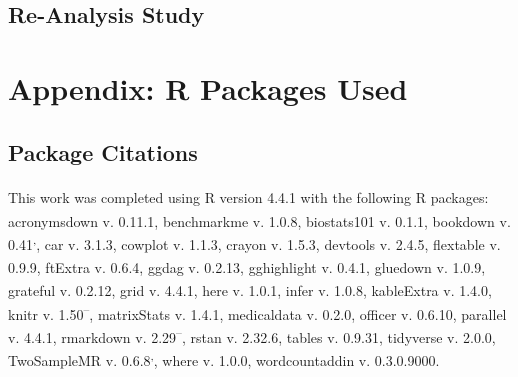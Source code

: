 \documentclass[
]{article}
\begin{document}
\newpage

\subsection{Re-Analysis Study}\label{appendix-sens-reanalysis}

\section{Appendix: R Packages Used}\label{appendix-pkg}

\subsection{Package Citations}\label{package-citations}

This work was completed using R version 4.4.1\textsuperscript{} with the following R packages: acronymsdown v. 0.11.1\textsuperscript{}, benchmarkme v. 1.0.8\textsuperscript{}, biostats101 v. 0.1.1\textsuperscript{}, bookdown v. 0.41\textsuperscript{,}, car v. 3.1.3\textsuperscript{}, cowplot v. 1.1.3\textsuperscript{}, crayon v. 1.5.3\textsuperscript{}, devtools v. 2.4.5\textsuperscript{}, flextable v. 0.9.9\textsuperscript{}, ftExtra v. 0.6.4\textsuperscript{}, ggdag v. 0.2.13\textsuperscript{}, gghighlight v. 0.4.1\textsuperscript{}, gluedown v. 1.0.9\textsuperscript{}, grateful v. 0.2.12\textsuperscript{}, grid v. 4.4.1\textsuperscript{}, here v. 1.0.1\textsuperscript{}, infer v. 1.0.8\textsuperscript{}, kableExtra v. 1.4.0\textsuperscript{}, knitr v. 1.50\textsuperscript{--}, matrixStats v. 1.4.1\textsuperscript{}, medicaldata v. 0.2.0\textsuperscript{}, officer v. 0.6.10\textsuperscript{}, parallel v. 4.4.1\textsuperscript{}, rmarkdown v. 2.29\textsuperscript{--}, rstan v. 2.32.6\textsuperscript{}, tables v. 0.9.31\textsuperscript{}, tidyverse v. 2.0.0\textsuperscript{}, TwoSampleMR v. 0.6.8\textsuperscript{,}, where v. 1.0.0\textsuperscript{}, wordcountaddin v. 0.3.0.9000\textsuperscript{}.
\end{document}
